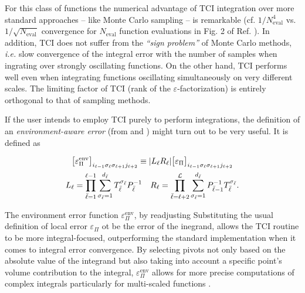 For this class of functions the numerical advantage of TCI integration over more standard approaches -- like Monte Carlo sampling -- is remarkable (cf. $1/N_{\text{eval}}^4$ vs. $1/\sqrt{N_{\text{eval}}}$ convergence for $N_{\text{eval}}$ function evaluations in Fig. 2 of Ref. \cite{Fernandez2024}). In addition, TCI does not suffer from the \textit{``sign problem''} \cite{Loh1990} of Monte Carlo methods, \textit{i.e.} slow convergence of the integral error with the number of samples when ingrating over strongly oscillating functions. On the other hand, TCI performs well even when integrating functions oscillating simultaneously on very different scales. The limiting factor of TCI (rank of the $\varepsilon$-factorization) is entirely orthogonal
to that of sampling methods.

If the user intends to employ TCI purely to perform integrations, the definition of an \textit{environment-aware error} (from  and ) might turn out to be very useful. It is defined as

\begin{gather}
	\nonumber\bigl[\varepsilon^{\text{env}}_\Pi\bigr]_{i_{\ell-1}\sigma_\ell \sigma_{\ell +1} j_{\ell +2 }}\equiv |L_\ell R_\ell| \bigl[\varepsilon_\Pi\bigr]_{i_{\ell-1}\sigma_\ell \sigma_{\ell +1} j_{\ell +2 }} \\
	L_\ell = \prod_{\bar{\ell}=1}^{\ell -1} \sum^{d_{\bar{\ell}}}_{\sigma_{\bar{\ell}} = 1} T^{\sigma_{\bar{\ell}}}_{\bar{\ell}} P^{-1}_{\bar{\ell}} \quad R_\ell = \prod_{\bar{\ell}=\ell +2}^{\mathcal{L}} \sum^{d_{\bar{\ell}}}_{\sigma_{\bar{\ell}} = 1}  P^{-1}_{\bar{\ell}-1}T^{\sigma_{\bar{\ell}}}_{\bar{\ell}}.
	\label{eq:envError}
\end{gather}

The environment error function $\varepsilon^{\text{env}}_\Pi$, by readjusting 
Substituting the usual definition of local  error $\varepsilon_\Pi$ ot be the error of the inegrand, allows the TCI routine to be more integral-focused, outperforming the standard implementation when it comes to integral error convergence. By selecting pivots not only based on the absolute value of the integrand but also taking into account a specific point's volume contribution to the integral,  $\varepsilon^{\text{env}}_\Pi$ allows for more precise computations of complex integrals particularly for multi-scaled functions \cite{Fernandez2022}.   

